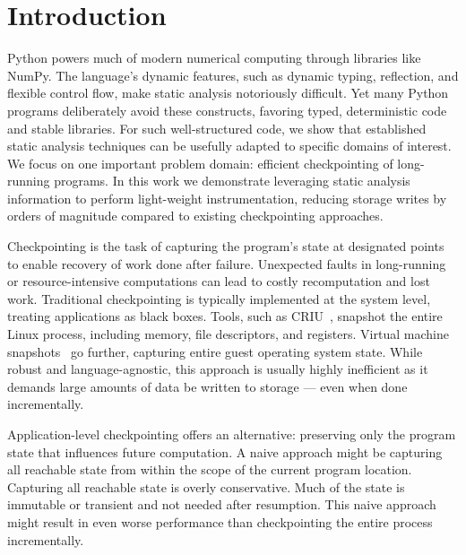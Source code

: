 \section{Introduction}
Python powers much of modern numerical computing through libraries like NumPy. The language’s dynamic features, such as dynamic typing, reflection, and flexible control flow, make static analysis notoriously difficult. Yet many Python programs deliberately avoid these constructs, favoring typed, deterministic code and stable libraries. For such well-structured code, we show that established static analysis techniques can be usefully adapted to specific domains of interest. We focus on one important problem domain: efficient checkpointing of long-running programs. 
In this work we demonstrate leveraging static analysis information to perform light-weight instrumentation, reducing storage writes by orders of magnitude compared to existing checkpointing approaches.

Checkpointing is the task of capturing the program’s state at designated points to enable recovery of work done after failure. Unexpected faults in long-running or resource-intensive computations can lead to costly recomputation and lost work. Traditional checkpointing is typically implemented at the system level, treating applications as black boxes. Tools, such as CRIU~\cite{CRIUProject}, snapshot the entire Linux process, including memory, file descriptors, and registers. Virtual machine snapshots~\cite{VMwareSnapshot, RedHatVMSnapshot} go further, capturing entire guest operating system state. While robust and language-agnostic, this approach is usually highly inefficient as it demands large amounts of data be written to storage --- even when done incrementally.

Application-level checkpointing offers an alternative: preserving only the program state that influences future computation. A naive approach might be capturing all reachable state from within the scope of the current program location. Capturing all reachable state is overly conservative. Much of the state is immutable or transient and not needed after resumption.  This naive approach might result in even worse performance than checkpointing the entire process incrementally.


